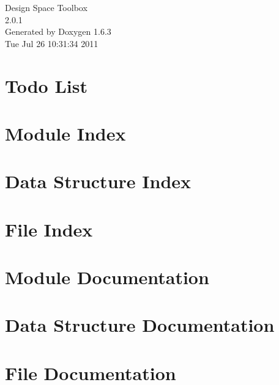 \documentclass[a4paper]{book}
\begin{document}
\hypersetup{pageanchor=false}
\begin{titlepage}
\vspace*{7cm}
\begin{center}
{\Large Design Space Toolbox \\[1ex]\large 2.0.1 }\\
\vspace*{1cm}
{\large Generated by Doxygen 1.6.3}\\
\vspace*{0.5cm}
{\small Tue Jul 26 10:31:34 2011}\\
\end{center}
\end{titlepage}
\clearemptydoublepage
{}
\tableofcontents
\clearemptydoublepage
{}
\hypersetup{pageanchor=true}
\chapter{Todo List}
\label{todo}
\hypertarget{todo}{}

\chapter{Module Index}

\chapter{Data Structure Index}

\chapter{File Index}

\chapter{Module Documentation}



\chapter{Data Structure Documentation}









\chapter{File Documentation}














\printindex
\end{document}

